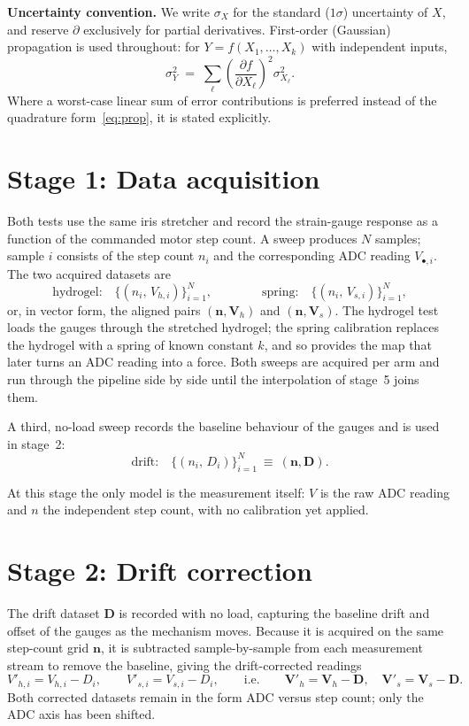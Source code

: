 \documentclass[11pt]{article}
\newcommand{\dset}[1]{\mathbf{#1}}          %
\newcommand{\unc}[1]{\sigma_{#1}}           %
\begin{document}
\noindent\textbf{Uncertainty convention.} We write $\unc{X}$ for the standard ($1\sigma$)
uncertainty of $X$, and reserve $\partial$ exclusively for partial derivatives. First-order
(Gaussian) propagation is used throughout: for $Y=f(X_1,\dots,X_k)$ with independent inputs,
\begin{equation}
\unc{Y}^2 \;=\; \sum_{\ell}\left(\frac{\partial f}{\partial X_\ell}\right)^{\!2}\unc{X_\ell}^2 .
\label{eq:prop}
\end{equation}
Where a worst-case linear sum of error contributions is preferred instead of the quadrature
form~\eqref{eq:prop}, it is stated explicitly.

\section{Stage 1: Data acquisition}
\label{sec:acq}
Both tests use the same iris stretcher and record the strain-gauge response as a function of
the commanded motor step count. A sweep produces $N$ samples; sample $i$ consists of the step
count $n_i$ and the corresponding ADC reading $V_{\bullet,i}$. The two acquired datasets are
\begin{equation}
\text{hydrogel:}\quad \{(n_i,\,V_{h,i})\}_{i=1}^{N},
\qquad\qquad
\text{spring:}\quad \{(n_i,\,V_{s,i})\}_{i=1}^{N},
\end{equation}
or, in vector form, the aligned pairs $(\dset{n},\dset{V}_h)$ and $(\dset{n},\dset{V}_s)$.
The hydrogel test loads the gauges through the stretched hydrogel; the spring calibration
replaces the hydrogel with a spring of known constant $k$, and so provides the map that later
turns an ADC reading into a force. Both sweeps are acquired per arm and run through the
pipeline side by side until the interpolation of stage~5 joins them.

A third, no-load sweep records the baseline behaviour of the gauges and is used in stage~2:
\begin{equation}
\text{drift:}\quad \{(n_i,\,D_i)\}_{i=1}^{N}\ \equiv\ (\dset{n},\dset{D}).
\end{equation}

At this stage the only model is the measurement itself: $V$ is the raw ADC reading and $n$ the
independent step count, with no calibration yet applied.

\section{Stage 2: Drift correction}
\label{sec:drift}
The drift dataset $\dset{D}$ is recorded with no load, capturing the baseline drift and offset
of the gauges as the mechanism moves. Because it is acquired on the same step-count grid
$\dset{n}$, it is subtracted sample-by-sample from each measurement stream to remove the
baseline, giving the drift-corrected readings
\begin{equation}
V'_{h,i}=V_{h,i}-D_i,
\qquad
V'_{s,i}=V_{s,i}-D_i,
\qquad\text{i.e.}\qquad
\dset{V}'_h=\dset{V}_h-\dset{D},\quad
\dset{V}'_s=\dset{V}_s-\dset{D}.
\label{eq:drift}
\end{equation}
Both corrected datasets remain in the form ADC versus step count; only the ADC axis has been
shifted.
\end{document}
